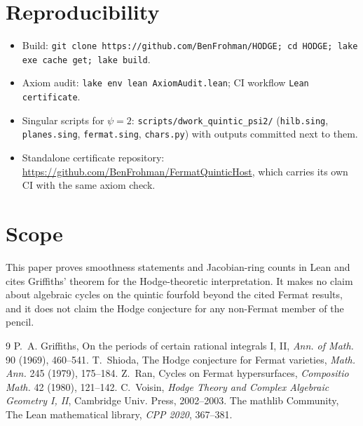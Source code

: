 \documentclass[11pt]{article}
\theoremstyle{definition}\newtheorem{definition}[theorem]{Definition}\newtheorem{remark}[theorem]{Remark}
\begin{document}
\section{Reproducibility}
\begin{itemize}
\item Build: \texttt{git clone https://github.com/BenFrohman/HODGE; cd HODGE; lake exe cache get; lake build}.
\item Axiom audit: \texttt{lake env lean AxiomAudit.lean}; CI workflow \texttt{Lean certificate}.
\item Singular scripts for $\psi=2$: \texttt{scripts/dwork\_quintic\_psi2/} (\texttt{hilb.sing}, \texttt{planes.sing},
\texttt{fermat.sing}, \texttt{chars.py}) with outputs committed next to them.
\item Standalone certificate repository: \url{https://github.com/BenFrohman/FermatQuinticHost}, which carries its own
CI with the same axiom check.
\end{itemize}

\section*{Scope}
This paper proves smoothness statements and Jacobian-ring counts in Lean and cites Griffiths' theorem for
the Hodge-theoretic interpretation. It makes no claim about algebraic cycles on the quintic fourfold beyond
the cited Fermat results, and it does not claim the Hodge conjecture for any non-Fermat member of the pencil.

\begin{thebibliography}{9}
 P.~A. Griffiths, On the periods of certain rational integrals I, II, \emph{Ann. of Math.} 90 (1969), 460--541.
 T.~Shioda, The Hodge conjecture for Fermat varieties, \emph{Math. Ann.} 245 (1979), 175--184.
 Z.~Ran, Cycles on Fermat hypersurfaces, \emph{Compositio Math.} 42 (1980), 121--142.
 C.~Voisin, \emph{Hodge Theory and Complex Algebraic Geometry I, II}, Cambridge Univ. Press, 2002--2003.
 The mathlib Community, The Lean mathematical library, \emph{CPP 2020}, 367--381.
\end{thebibliography}
\end{document}
